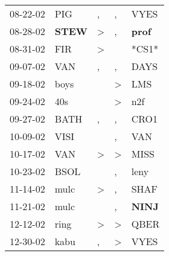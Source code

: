 \begin{supertabular}{p{0.07\textwidth}p{0.06\textwidth}p{0.02\textwidth}p{0.02\textwidth}p{0.06\textwidth}}
          08-22-02\textsuperscript{} &            PIG\textsuperscript{} &                , &                , &           VYES\textsuperscript{} \\
          08-28-02\textsuperscript{} &  \textbf{STEW\textsuperscript{}} &     \textgreater &                , &  \textbf{prof\textsuperscript{}} \\
          08-31-02\textsuperscript{} &            FIR\textsuperscript{} &     \textgreater &                  &                            *CS1* \\
          09-07-02\textsuperscript{} &            VAN\textsuperscript{} &                , &                , &           DAYS\textsuperscript{} \\
          09-18-02\textsuperscript{} &           boys\textsuperscript{} &                  &     \textgreater &            LMS\textsuperscript{} \\
          09-24-02\textsuperscript{} &            40s\textsuperscript{} &                  &     \textgreater &            n2f\textsuperscript{} \\
          09-27-02\textsuperscript{} &           BATH\textsuperscript{} &                , &                , &           CRO1\textsuperscript{} \\
          10-09-02\textsuperscript{} &           VISI\textsuperscript{} &                  &                , &            VAN\textsuperscript{} \\
          10-17-02\textsuperscript{} &            VAN\textsuperscript{} &     \textgreater &     \textgreater &           MISS\textsuperscript{} \\
          10-23-02\textsuperscript{} &           BSOL\textsuperscript{} &                  &                , &           leny\textsuperscript{} \\
          11-14-02\textsuperscript{} &           mulc\textsuperscript{} &     \textgreater &                , &           SHAF\textsuperscript{} \\
          11-21-02\textsuperscript{} &           mulc\textsuperscript{} &                  &                , &  \textbf{NINJ\textsuperscript{}} \\
          12-12-02\textsuperscript{} &           ring\textsuperscript{} &     \textgreater &     \textgreater &           QBER\textsuperscript{} \\
          12-30-02\textsuperscript{} &           kabu\textsuperscript{} &                , &     \textgreater &           VYES\textsuperscript{} \\

\end{supertabular}
